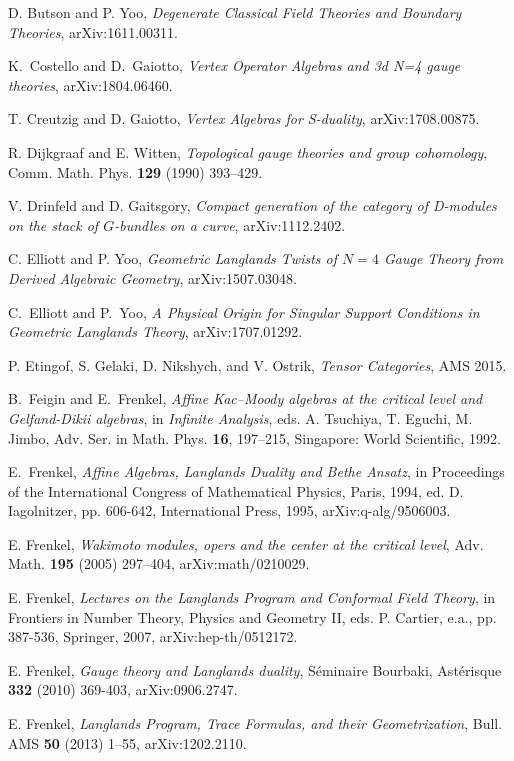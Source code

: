 \documentclass[11pt,reqno]{amsart}
\theoremstyle{plain}
\numberwithin{equation}{section}
\theoremstyle{definition}
\begin{document}
\begin{thebibliography}{AFO}
 D. Butson and P. Yoo, {\em Degenerate Classical Field Theories
  and Boundary Theories}, arXiv:1611.00311.

  K.~Costello and D.~Gaiotto,
  {\em Vertex Operator Algebras and 3d N=4 gauge theories},
  arXiv:1804.06460.
  
 T. Creutzig and D. Gaiotto, {\em Vertex Algebras for
  S-duality}, arXiv:1708.00875.

 R. Dijkgraaf and E. Witten, {\em Topological gauge theories and
  group cohomology}, Comm. Math. Phys. {\bf 129} (1990) 393--429.

 V. Drinfeld and D. Gaitsgory, {\em Compact generation of the
  category of D-modules on the stack of $G$-bundles on a curve},
arXiv:1112.2402.

 C. Elliott and P. Yoo, {\em Geometric Langlands Twists
  of $N=4$ Gauge Theory from Derived Algebraic Geometry},
arXiv:1507.03048.

 C.~Elliott and P.~Yoo, {\em A Physical Origin for Singular 
Support Conditions in Geometric Langlands Theory},
arXiv:1707.01292.

 P. Etingof, S. Gelaki, D. Nikshych, and V. Ostrik, {\em
  Tensor Categories}, AMS 2015.

 B.~Feigin and E.~Frenkel, {\em Affine Kac--Moody
algebras at the critical level and Gelfand-Dikii algebras}, in {\em
Infinite Analysis}, eds. A.  Tsuchiya, T. Eguchi, M. Jimbo, Adv.
Ser. in Math. Phys. {\bf 16}, 197--215, Singapore: World Scientific,
1992.

 E.~Frenkel, {\em Affine Algebras, Langlands Duality
  and Bethe Ansatz}, in Proceedings of the International Congress of
  Mathematical Physics, Paris, 1994, ed. D. Iagolnitzer, pp. 606-642,
  International Press, 1995, arXiv:q-alg/9506003.

 E. Frenkel, {\em Wakimoto modules, opers and the center
  at the critical level}, Adv. Math. {\bf 195} (2005) 297--404,
  arXiv:math/0210029.

 E. Frenkel, {\em Lectures on the Langlands Program and
    Conformal Field Theory}, in Frontiers in Number Theory, Physics
  and Geometry II, eds. P. Cartier, e.a., pp. 387-536, Springer, 2007,
  arXiv:hep-th/0512172.

 E. Frenkel, {\em Gauge theory and Langlands duality},
S\'eminaire Bourbaki, Ast\'erisque {\bf 332} (2010) 369-403,
arXiv:0906.2747.

 E. Frenkel, {\em Langlands Program, Trace Formulas, and
  their Geometrization}, Bull. AMS {\bf 50} (2013) 1--55,
arXiv:1202.2110.


\end{thebibliography}
\end{document}
